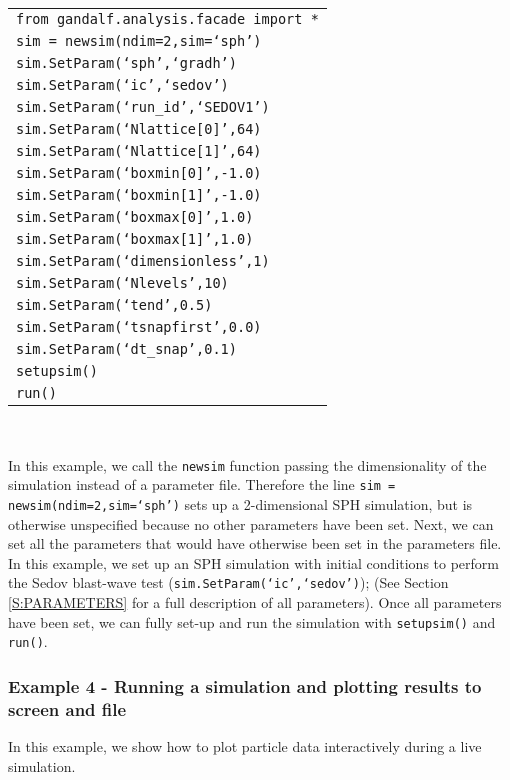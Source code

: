 \documentclass[a4paper]{article}
\newcommand{\var}[1]{\texttt{#1}}
\begin{document}
\begin{tabular}{p{14.0cm}}
\var{from gandalf.analysis.facade import *} \\
\var{sim = newsim(ndim=2,sim=`sph')} \\
\var{sim.SetParam(`sph',`gradh')} \\
\var{sim.SetParam(`ic',`sedov')} \\
\var{sim.SetParam(`run\_id',`SEDOV1')} \\
\var{sim.SetParam(`Nlattice[0]',64)} \\
\var{sim.SetParam(`Nlattice[1]',64)} \\
\var{sim.SetParam(`boxmin[0]',-1.0)} \\
\var{sim.SetParam(`boxmin[1]',-1.0)} \\
\var{sim.SetParam(`boxmax[0]',1.0)} \\
\var{sim.SetParam(`boxmax[1]',1.0)} \\
\var{sim.SetParam(`dimensionless',1)} \\
\var{sim.SetParam(`Nlevels',10)} \\
\var{sim.SetParam(`tend',0.5)} \\
\var{sim.SetParam(`tsnapfirst',0.0)} \\
\var{sim.SetParam(`dt\_snap',0.1)} \\
\var{setupsim()} \\
\var{run()} \\
\end{tabular} \\
\newline

\noindent In this example, we call the \var{newsim} function passing the dimensionality of the simulation instead of a parameter file.  Therefore the line \var{sim = newsim(ndim=2,sim=`sph')} sets up a 2-dimensional SPH simulation, but is otherwise unspecified because no other parameters have been set.  Next, we can set all the parameters that would have otherwise been set in the parameters file.  In this example, we set up an SPH simulation with initial conditions to perform the Sedov blast-wave test (\var{sim.SetParam(`ic',`sedov')}); (See Section \ref{S:PARAMETERS} for a full description of all parameters).  Once all parameters have been set, we can fully set-up and run the simulation with \var{setupsim()} and \var{run()}.
\newpage


\subsubsection{Example 4 - Running a simulation and plotting results to screen and file}
In this example, we show how to plot particle data interactively during a live simulation. \\
\end{document}
